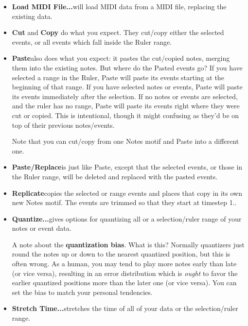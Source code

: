 \documentclass[twoside,10pt]{article}
\begin{document}
\begin{itemize}

\item{\bf Load MIDI File...}\quad will load MIDI data from a MIDI file, replacing the existing data.

\item{\bf Cut} and {\bf Copy} do what you expect.  They cut/copy either the selected events, or all events which fall inside the Ruler range.

\item {\bf Paste}\quad also does what you expect: it pastes the cut/copied notes, merging them into the existing notes.  But where do the Pasted events go?  If you have selected a range in the Ruler, Paste will paste its events starting at the beginning of that range.  If you have selected notes or events, Paste will paste its events immediately after the selection.  If no notes or events are selected, and the ruler has no range, Paste will paste its events right where they were cut or copied.  This is intentional, though it might confusing as they'd be on top of their previous notes/events.

Note that you can cut/copy from one Notes motif and Paste into a different one.

\item {\bf Paste/Replace}\quad is just like Paste, except that the selected events, or those in the Ruler range, will be deleted and replaced with the pasted events.

\item {\bf Replicate}\quad copies the selected or range events and places that copy in its own new Notes motif.  The events are trimmed so that they start at timestep 1..

\item{\bf Quantize...}\quad gives options for quantizing all or a selection/ruler range of your notes or event data. 

 A note about  the {\bf quantization bias}.  What is this?  Normally quantizers just round the notes up or down to the nearest quantized position, but this is often wrong.  As a human, you may tend to play more notes early than late (or vice versa), resulting in an error distribution which is {\it ought} to favor the earlier quantized positions more than the later one (or vice versa).  You can set the bias to match your personal tendencies.

\item{\bf Stretch Time...}\quad stretches the time of all of your data or the selection/ruler range.


\end{itemize}
\end{document}
